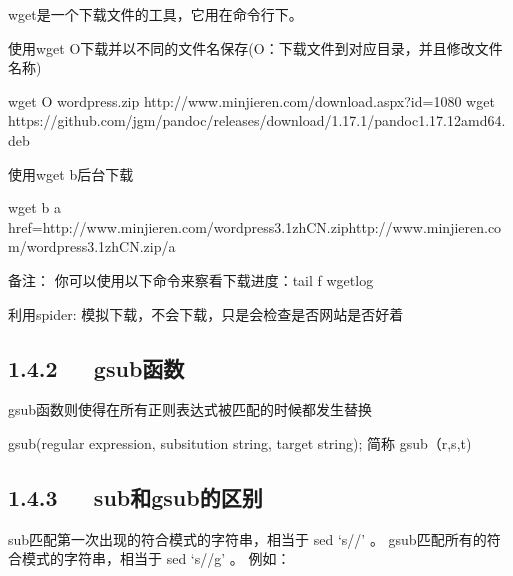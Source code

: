 \documentclass[letterpaper,12pt,english]{sphinxmanual}
\begin{document}
wget是一个下载文件的工具，它用在命令行下。

使用wget \sphinxhyphen{}O下载并以不同的文件名保存(\sphinxhyphen{}O：下载文件到对应目录，并且修改文件名称)

\begin{sphinxVerbatim}[commandchars=\\\{\}]
wget \PYGZhy{}O wordpress.zip http://www.minjieren.com/download.aspx?id=1080
wget https://github.com/jgm/pandoc/releases/download/1.17.1/pandoc\PYGZhy{}1.17.1\PYGZhy{}2\PYGZhy{}amd64.deb
\end{sphinxVerbatim}

使用wget \sphinxhyphen{}b后台下载

\begin{sphinxVerbatim}[commandchars=\\\{\}]
wget \PYGZhy{}b \PYGZlt{}a href=\PYGZdq{}http://www.minjieren.com/wordpress\PYGZhy{}3.1\PYGZhy{}zh\PYGZus{}CN.zip\PYGZdq{}\PYGZgt{}http://www.minjieren.com/wordpress\PYGZhy{}3.1\PYGZhy{}zh\PYGZus{}CN.zip\PYGZlt{}/a\PYGZgt{}

备注： 你可以使用以下命令来察看下载进度：tail \PYGZhy{}f wget\PYGZhy{}log
\end{sphinxVerbatim}

利用\sphinxhyphen{}spider: 模拟下载，不会下载，只是会检查是否网站是否好着

\begin{sphinxVerbatim}[commandchars=\\\{\}]
    
\end{sphinxVerbatim}


\subsection{1.4.2   gsub函数}
\label{\detokenize{001software/001install/linux:gsub}}
gsub函数则使得在所有正则表达式被匹配的时候都发生替换

\begin{sphinxVerbatim}[commandchars=\\\{\}]
gsub(regular expression, subsitution string, target string);
简称 gsub（r,s,t)
\end{sphinxVerbatim}


\subsection{1.4.3   sub和gsub的区别}
\label{\detokenize{001software/001install/linux:subgsub}}
sub匹配第一次出现的符合模式的字符串，相当于 sed ‘s//’ 。
gsub匹配所有的符合模式的字符串，相当于 sed ‘s//g’ 。
例如：
\end{document}
